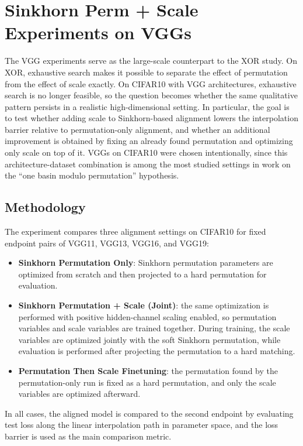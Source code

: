 \documentclass[11pt,a4paper]{article}
\begin{document}
\section{Sinkhorn Perm + Scale Experiments on VGGs}
The VGG experiments serve as the large-scale counterpart to the XOR study. On XOR, exhaustive search makes it possible to separate the effect of permutation from the effect of scale exactly. On CIFAR10 with VGG architectures, exhaustive search is no longer feasible, so the question becomes whether the same qualitative pattern persists in a realistic high-dimensional setting. In particular, the goal is to test whether adding scale to Sinkhorn-based alignment lowers the interpolation barrier relative to permutation-only alignment, and whether an additional improvement is obtained by fixing an already found permutation and optimizing only scale on top of it. VGGs on CIFAR10 were chosen intentionally, since this architecture-dataset combination is among the most studied settings in work on the “one basin modulo permutation” hypothesis.

\subsection{Methodology}
The experiment compares three alignment settings on CIFAR10 for fixed endpoint pairs of VGG11, VGG13, VGG16, and VGG19:
\begin{itemize}[leftmargin=1.5em]
    \item \textbf{Sinkhorn Permutation Only}: Sinkhorn permutation parameters are optimized from scratch and then projected to a hard permutation for evaluation.
    \item \textbf{Sinkhorn Permutation + Scale (Joint)}: the same optimization is performed with positive hidden-channel scaling enabled, so permutation variables and scale variables are trained together. During training, the scale variables are optimized jointly with the soft Sinkhorn permutation, while evaluation is performed after projecting the permutation to a hard matching.
    \item \textbf{Permutation Then Scale Finetuning}: the permutation found by the permutation-only run is fixed as a hard permutation, and only the scale variables are optimized afterward.
\end{itemize}
In all cases, the aligned model is compared to the second endpoint by evaluating test loss along the linear interpolation path in parameter space, and the loss barrier is used as the main comparison metric.
\end{document}
